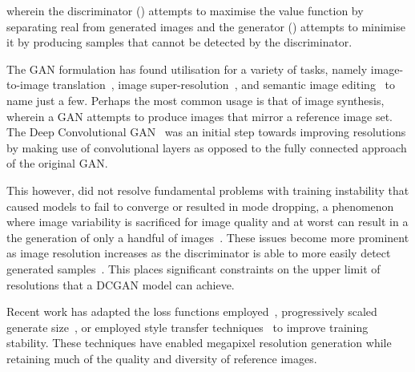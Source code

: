 \documentclass{article}
\begin{document}
wherein the discriminator () attempts to maximise the value function by separating real from generated images and the generator () attempts to minimise it by producing samples that cannot be detected by the discriminator.

The GAN formulation has found utilisation for a variety of tasks, namely image-to-image translation~\cite{isolaImagetoImageTranslationConditional2018,zhuUnpairedImagetoImageTranslation2018}, image super-resolution~\cite{ledigPhotoRealisticSingleImage2017,youCTSuperresolutionGAN2020}, and semantic image editing~\cite{shenInterpretingLatentSpace2020} to name just a few. Perhaps the most common usage is that of image synthesis, wherein a GAN attempts to produce images that mirror a reference image set. The Deep Convolutional GAN~\cite{radfordUnsupervisedRepresentationLearning2016} was an initial step towards improving resolutions by making use of convolutional layers as opposed to the fully connected approach of the original GAN. 

This however, did not resolve fundamental problems with training instability that caused models to fail to converge or resulted in mode dropping, a phenomenon where image variability is sacrificed for image quality and at worst can result in a the generation of only a handful of images~\cite{arjovskyPrincipledMethodsTraining2017}. These issues become more prominent as image resolution increases as the discriminator is able to more easily detect generated samples~\cite{karrasProgressiveGrowingGANs2018}. This places significant constraints on the upper limit of resolutions that a DCGAN model can achieve.

Recent work has adapted the loss functions employed~\cite{arjovskyPrincipledMethodsTraining2017,maoLeastSquaresGenerative2017,gulrajaniImprovedTrainingWasserstein2017}, progressively scaled generate size~\cite{karrasProgressiveGrowingGANs2018}, or employed style transfer techniques~\cite{karrasStyleBasedGeneratorArchitecture2019,karrasAnalyzingImprovingImage2020} to improve training stability. These techniques have enabled megapixel resolution generation while retaining much of the quality and diversity of reference images. 
\end{document}

